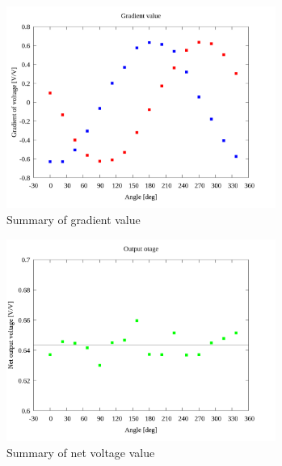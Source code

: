 \documentclass[twocolumn,a4j]{jsarticle}
\begin{document}
\begin{figure}[htbp]
    \footnotesize
    \begin{center}
        \includegraphics[width=88mm]{../images_2/05/05_summary-wave.png}
        \caption{Summary of gradient value}
    \end{center}
\end{figure}
\begin{figure}[htbp]
        \footnotesize
            \begin{center}
        \includegraphics[width=88mm]{../images_2/05/05_summary-outputvoltage.png}
        \caption{Summary of net voltage value}
    \end{center}
\end{figure}
\end{document}
